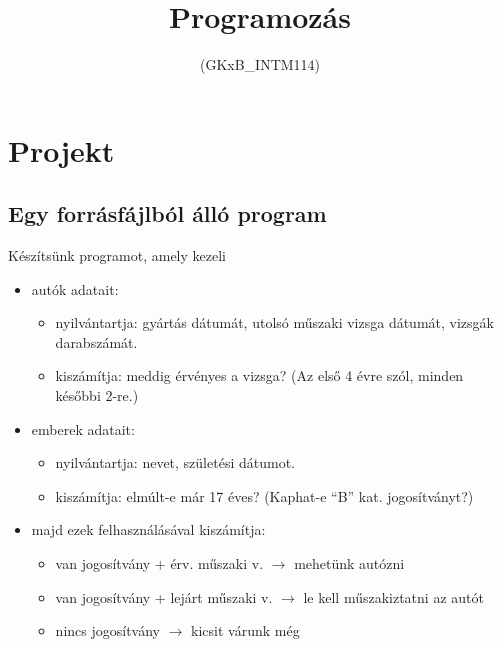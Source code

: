 \documentclass[usenames,dvipsnames,aspectratio=169]{beamer}
\title[10. előadás]{Programozás}
\subtitle{(GKxB\_INTM114)}
\begin{document}
\begin{frame}[plain]
  \titlepage
  \logoalul
\end{frame}

\section{Projekt}
\subsection{Egy forrásfájlból álló program}
\begin{frame}
  Készítsünk programot, amely kezeli
  \begin{itemize}
    \item autók adatait:
    \begin{itemize}
      \item nyilvántartja: gyártás dátumát, utolsó műszaki vizsga dátumát, vizsgák darabszámát.
      \item kiszámítja: meddig érvényes a vizsga? (Az első 4 évre szól, minden későbbi 2-re.)
    \end{itemize}
    \item emberek adatait:
    \begin{itemize}
      \item nyilvántartja: nevet, születési dátumot.
      \item kiszámítja: elmúlt-e már 17 éves? (Kaphat-e ``B'' kat. jogosítványt?)
    \end{itemize}
    \item majd ezek felhasználásával kiszámítja:
    \begin{itemize}
      \item van jogosítvány + érv. műszaki v. $\to$ mehetünk autózni
      \item van jogosítvány + lejárt műszaki v. $\to$ le kell műszakiztatni az autót
      \item nincs jogosítvány $\to$ kicsit várunk még
    \end{itemize}
  \end{itemize}
\end{frame}

\begin{frame}
  \begin{exampleblock}{}
    \small
    \vspace{-.2cm}
    
    \vspace{-.2cm}
  \end{exampleblock}
\end{frame}
\end{document}
